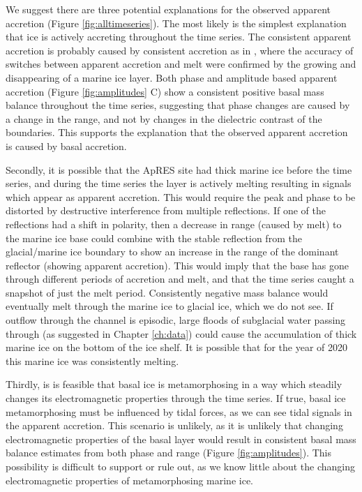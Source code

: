 
We suggest there are three potential explanations for the observed apparent accretion (Figure \ref{fig:alltimeseries}). 
The most likely is the simplest explanation that ice is actively accreting throughout the time series. The consistent apparent accretion is probably caused by consistent accretion as in \cite{vavnkova2021nature}, where the accuracy of switches between apparent accretion and melt were confirmed by the growing and disappearing of a marine ice layer. Both phase and amplitude based apparent accretion (Figure \ref{fig:amplitudes} C) show a consistent positive basal mass balance throughout the time series, suggesting that phase changes are caused by a change in the range, and not by changes in the dielectric contrast of the boundaries. This supports the explanation that the observed apparent accretion is caused by basal accretion.

Secondly, it is possible that the ApRES site had thick marine ice  before the time series, and during the time series the layer is actively melting resulting in signals which appear as apparent accretion. This would require the peak and phase to be distorted by destructive interference from multiple reflections. If one of the reflections had a shift in polarity, then a decrease in range (caused by melt) to the marine ice base could combine with the stable reflection from the glacial/marine ice boundary to show an increase in the range of the dominant reflector (showing apparent accretion).
This would imply that the base has gone through different periods of accretion and melt, and that the time series caught a snapshot of just the melt period. Consistently negative mass balance would eventually melt through the marine ice to glacial ice, which we do not see.  If outflow through the channel is episodic, large floods of subglacial water passing through (as suggested in Chapter \ref{ch:data}) could cause the accumulation of thick marine ice on the bottom of the ice shelf. It is possible that for the year of 2020 this marine ice was consistently melting. 

Thirdly, is is feasible that basal ice is metamorphosing in a way which steadily changes its electromagnetic properties through the time series. If true, basal ice metamorphosing must be influenced by tidal forces, as we can see tidal signals in the apparent accretion. This scenario is unlikely, as it is unlikely that changing electromagnetic properties of the basal layer would result in consistent basal mass balance estimates from both phase and range (Figure \ref{fig:amplitudes}).  This possibility is difficult to support or rule out, as we know little about the changing electromagnetic properties of metamorphosing marine ice. 

